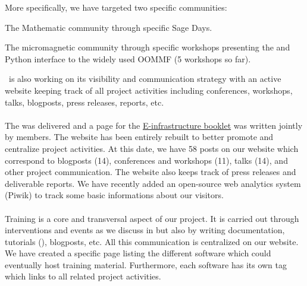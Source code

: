 \documentclass{deliverablereport}
\begin{document}
  More specifically, we have targeted two specific communities:

\begin{compactitem}
\item The Mathematic community through specific Sage Days.
\item The micromagnetic community through specific workshops presenting
the \Jupyter and Python interface to the widely used OOMMF  (5 workshops so far).
\end{compactitem}  
  

  \ODK\ is also working on its visibility and communication strategy with an active website keeping track of all
  project activities including conferences, workshops, talks, blogposts, press releases, reports, etc.
  
\paragraph{}

The  was delivered and a page for the \href{https://github.com/OpenDreamKit/OpenDreamKit/blob/master/Communication/eInfra-Booklet/ODK.md}{E-infrastructure booklet} was written jointly by \ODK members. The website has been 
entirely rebuilt to better promote  and centralize project activities. At this date, 
we have 58 posts on our website which correspond to blogposts (14), conferences and workshops (11),
talks (14), and other project communication. The website also keeps track of press releases
and deliverable reports. We have recently added an open-source web analytics system (Piwik) 
to track some basic informations about our visitors.

\paragraph{}

Training is a core and transversal aspect of our project. It is carried out 
through interventions and events as we discuss in  but also
by writing documentation, tutorials (), blogposts, etc. All
this communication is centralized on our website. We have created a specific 
page listing the different software which could eventually host training material. Furthermore,
each software has its own tag which links to all related project activities.
\end{document}
